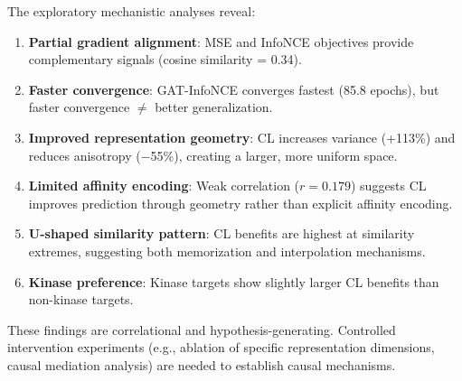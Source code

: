 \documentclass[10pt,a4paper]{article}
\begin{document}
The exploratory mechanistic analyses reveal:
\begin{enumerate}
\item \textbf{Partial gradient alignment}: MSE and InfoNCE objectives provide complementary signals (cosine similarity = 0.34).
\item \textbf{Faster convergence}: GAT-InfoNCE converges fastest (85.8 epochs), but faster convergence $\neq$ better generalization.
\item \textbf{Improved representation geometry}: CL increases variance (+113\%) and reduces anisotropy ($-$55\%), creating a larger, more uniform space.
\item \textbf{Limited affinity encoding}: Weak correlation ($r = 0.179$) suggests CL improves prediction through geometry rather than explicit affinity encoding.
\item \textbf{U-shaped similarity pattern}: CL benefits are highest at similarity extremes, suggesting both memorization and interpolation mechanisms.
\item \textbf{Kinase preference}: Kinase targets show slightly larger CL benefits than non-kinase targets.
\end{enumerate}

These findings are correlational and hypothesis-generating. Controlled intervention experiments (e.g., ablation of specific representation dimensions, causal mediation analysis) are needed to establish causal mechanisms.
\end{document}
